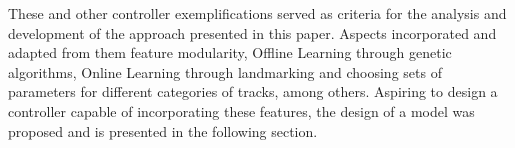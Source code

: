 	These and other controller exemplifications served as criteria for the analysis and development of the
	approach presented in this paper. Aspects incorporated and adapted from them feature modularity, Offline Learning
	through genetic algorithms, Online Learning through landmarking and choosing sets of parameters for different
	categories of tracks, among others. Aspiring to design a controller capable of incorporating these features, the design of
	a model was proposed and is presented in the following section.
